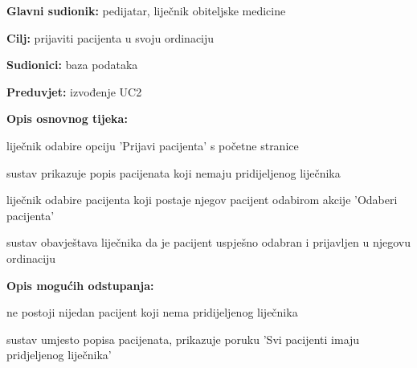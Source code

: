                     \noindent {}
					\begin{packed_item}
	
						\item \textbf{Glavni sudionik: }pedijatar, liječnik obiteljske medicine
						\item  \textbf{Cilj:} prijaviti pacijenta u svoju ordinaciju
						\item  \textbf{Sudionici:} baza podataka
						\item  \textbf{Preduvjet:} izvođenje UC2
						\item  \textbf{Opis osnovnog tijeka:}
						
						\item[] \begin{packed_enum}
							\item liječnik odabire opciju 'Prijavi pacijenta' s početne stranice
							\item sustav prikazuje popis pacijenata koji nemaju pridijeljenog liječnika
							\item liječnik odabire pacijenta koji postaje njegov pacijent odabirom akcije 'Odaberi pacijenta'
							\item sustav obavještava liječnika da je pacijent uspješno odabran i prijavljen u njegovu ordinaciju

						\end{packed_enum}
						
						\item  \textbf{Opis mogućih odstupanja:}
						
						\item[] \begin{packed_item}
	
							\item[2.a] ne postoji nijedan pacijent koji nema pridijeljenog liječnika
							\item[] \begin{packed_enum}
								\item sustav umjesto popisa pacijenata, prikazuje poruku 'Svi pacijenti imaju pridjeljenog liječnika'
							\end{packed_enum}
							
						\end{packed_item}
					\end{packed_item}

